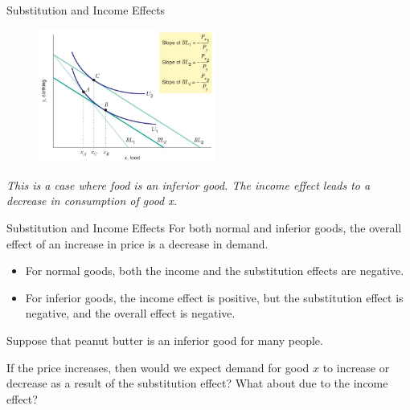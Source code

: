 \documentclass[12pt,t]{beamer}
\begin{document}
\begin{frame}{Substitution and Income Effects}
  \begin{figure}
    \includegraphics[width=220px]{figures/fig5_8.jpg}
  \end{figure}

  \emph{This is a case where food is an inferior good. The income effect leads to a decrease in consumption of good x.}
\end{frame}

\begin{frame}{Substitution and Income Effects}
  For both normal and inferior goods, the overall effect of an increase in price is a decrease in demand.

  \bigskip
  \begin{itemize}
    \item For normal goods, both the income and the substitution effects are negative.

    \item For inferior goods, the income effect is positive, but the substitution effect is negative, and the overall effect is negative.
  \end{itemize}
\end{frame}

\begin{frame}

  \bigskip
  Suppose that peanut butter is an inferior good for many people. 
  
  \smallskip
  If the price increases, then would we expect demand for good $x$ to increase or decrease as a result of the substitution effect? What about due to the income effect?

\end{frame}
\end{document}
